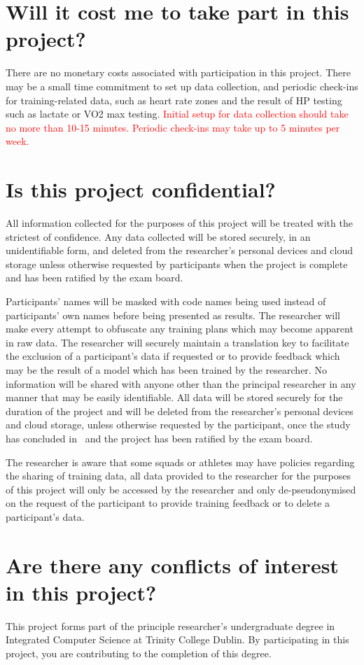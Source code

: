 \section*{Will it cost me to take part in this project?}
There are no monetary costs associated with participation in this project. There may be a small time commitment to set up data collection, and periodic check-ins for training-related data, such as heart rate zones and the result of HP testing such as lactate or VO2 max testing. \textcolor{red}{Initial setup for data collection should take no more than 10-15 minutes. Periodic check-ins may take up to 5 minutes per week.}
\section*{Is this project confidential?}
All information collected for the purposes of this project will be treated with the strictest of confidence. Any data collected will be stored securely, in an unidentifiable form, and deleted from the researcher's personal devices and cloud storage unless otherwise requested by participants when the project is complete and has been ratified by the exam board.

Participants' names will be masked with code names being used instead of participants' own names before being presented as results. The researcher will make every attempt to obfuscate any training plans which may become apparent in raw data. The researcher will securely maintain a translation key to facilitate the exclusion of a participant's data if requested or to provide feedback which may be the result of a model which has been trained by the researcher. No information will be shared with anyone other than the principal researcher in any manner that may be easily identifiable. All data will be stored securely for the duration of the project and will be deleted from the researcher's personal devices and cloud storage, unless otherwise requested by the participant, once the study has concluded in \deadline~and the project has been ratified by the exam board.

The researcher is aware that some squads or athletes may have policies regarding the sharing of training data, all data provided to the researcher for the purposes of this project will only be accessed by the researcher and only de-pseudonymised on the request of the participant to provide training feedback or to delete a participant's data.
\section*{Are there any conflicts of interest in this project?}
This project forms part of the principle researcher's undergraduate degree in Integrated Computer Science at Trinity College Dublin. By participating in this project, you are contributing to the completion of this degree.
